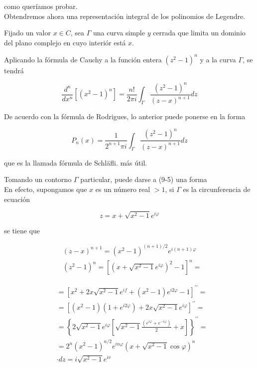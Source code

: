 \documentclass[10pt]{article}
\theoremstyle{plain}
\theoremstyle{definition}
\theoremstyle{remark}
\begin{document}
como queríamos probar.\\
Obtendremos ahora una representación integral de los polinomios de Legendre.

Fijado un valor $x \in C$, sea $\Gamma$ una curva simple $y$ cerrada que limita un dominio del plano complejo en cuyo interiór está $x$.

Aplicando la fórmula de Cauchy a la función entera $\left(z^{2}-1\right)^{n}$ y a la curva $\Gamma$, se tendrá

$$
\frac{d^{n}}{d x^{n}}\left[\left(x^{2}-1\right)^{n}\right]=\frac{n!}{2 \pi i} \int_{\Gamma} \frac{\left(z^{2}-1\right)^{n}}{(z-x)^{n+1}} d z
$$

De acuerdo con la fórmula de Rodrigues, lo anterior puede ponerse en la forma


\begin{equation*}
P_{n}(x)=\frac{1}{2^{n+1} \pi i} \int_{\Gamma} \frac{\left(z^{2}-1\right)^{n}}{(z-x)^{n+1}} d z \tag{9.5}
\end{equation*}


que es la llamada fórmula de Schläfli. más útil.

Tomando un contorno $\Gamma$ particular, puede darse a (9-5) una forma\\
En efecto, supongamos que $x$ es un número real $>1$, si $\Gamma$ es la circunferencia de ecuación

$$
z=x+\sqrt{x^{2}-1} e^{i \varphi}
$$

se tiene que

$$
\begin{aligned}
& (z-x)^{n+1}=\left(x^{2}-1\right)^{(n+1) / 2} e^{i(n+1) \varphi} \\
& \left(z^{2}-1\right)^{n}=\left[\left(x+\sqrt{x^{2}-1} e^{i \varphi}\right)^{2}-1\right]^{n}=
\end{aligned}
$$

$$
\begin{aligned}
& =\left[x^{2}+2 x \sqrt{x^{2}-1} e^{i f}+\left(x^{2}-1\right) e^{i 2 \varphi}-1\right]^{\prime \prime}= \\
& =\left[\left(x^{2}-1\right)\left(1+e^{i 2 \varphi}\right)+2 x \sqrt{x^{2}-1} e^{i \varphi}\right]^{\prime \prime}= \\
& =\left\{2 \sqrt{x^{2}-1} e^{i \varphi}\left[\sqrt{x^{2}-1} \frac{\left(e^{i \varphi}+e^{-i \varphi}\right)}{2}+x\right]\right\}^{\prime \prime}= \\
& =2^{n}\left(x^{2}-1\right)^{n / 2} e^{i n \varphi}\left(x+\sqrt{x^{2}-1} \cos \varphi\right)^{n} \\
& \cdot d z=i \sqrt{x^{2}-1} e^{i v}
\end{aligned}
$$
\end{document}

